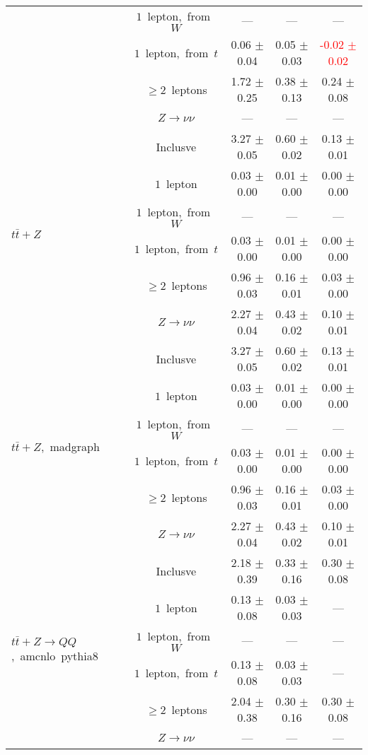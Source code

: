 \documentclass{article}
\begin{document}
\begin{longtable}{|l|c|c|c|c|}
 & $1$~lepton,~from~$W$  & ---  & ---  & --- \\* 
 & $1$~lepton,~from~$t$  & 0.06 $\pm$ 0.04  & 0.05 $\pm$ 0.03  & \textcolor{red}{ -0.02 $\pm$ 0.02 } \\* 
 & $\ge2$~leptons  & 1.72 $\pm$ 0.25  & 0.38 $\pm$ 0.13  & 0.24 $\pm$ 0.08 \\* 
 & $Z\rightarrow\nu\nu$  & ---  & ---  & --- \\* 
\hline 
\multirow{6}{*}{$t\bar{t}+Z$} & Inclusve  & 3.27 $\pm$ 0.05  & 0.60 $\pm$ 0.02  & 0.13 $\pm$ 0.01 \\* 
 & $1$~lepton  & 0.03 $\pm$ 0.00  & 0.01 $\pm$ 0.00  & 0.00 $\pm$ 0.00 \\* 
 & $1$~lepton,~from~$W$  & ---  & ---  & --- \\* 
 & $1$~lepton,~from~$t$  & 0.03 $\pm$ 0.00  & 0.01 $\pm$ 0.00  & 0.00 $\pm$ 0.00 \\* 
 & $\ge2$~leptons  & 0.96 $\pm$ 0.03  & 0.16 $\pm$ 0.01  & 0.03 $\pm$ 0.00 \\* 
 & $Z\rightarrow\nu\nu$  & 2.27 $\pm$ 0.04  & 0.43 $\pm$ 0.02  & 0.10 $\pm$ 0.01 \\* 
\hline 
\multirow{6}{*}{$t\bar{t}+Z$,~madgraph} & Inclusve  & 3.27 $\pm$ 0.05  & 0.60 $\pm$ 0.02  & 0.13 $\pm$ 0.01 \\* 
 & $1$~lepton  & 0.03 $\pm$ 0.00  & 0.01 $\pm$ 0.00  & 0.00 $\pm$ 0.00 \\* 
 & $1$~lepton,~from~$W$  & ---  & ---  & --- \\* 
 & $1$~lepton,~from~$t$  & 0.03 $\pm$ 0.00  & 0.01 $\pm$ 0.00  & 0.00 $\pm$ 0.00 \\* 
 & $\ge2$~leptons  & 0.96 $\pm$ 0.03  & 0.16 $\pm$ 0.01  & 0.03 $\pm$ 0.00 \\* 
 & $Z\rightarrow\nu\nu$  & 2.27 $\pm$ 0.04  & 0.43 $\pm$ 0.02  & 0.10 $\pm$ 0.01 \\* 
\hline 
\multirow{6}{*}{$t\bar{t}+Z{\rightarrow}QQ$,~amcnlo~pythia8} & Inclusve  & 2.18 $\pm$ 0.39  & 0.33 $\pm$ 0.16  & 0.30 $\pm$ 0.08 \\* 
 & $1$~lepton  & 0.13 $\pm$ 0.08  & 0.03 $\pm$ 0.03  & --- \\* 
 & $1$~lepton,~from~$W$  & ---  & ---  & --- \\* 
 & $1$~lepton,~from~$t$  & 0.13 $\pm$ 0.08  & 0.03 $\pm$ 0.03  & --- \\* 
 & $\ge2$~leptons  & 2.04 $\pm$ 0.38  & 0.30 $\pm$ 0.16  & 0.30 $\pm$ 0.08 \\* 
 & $Z\rightarrow\nu\nu$  & ---  & ---  & --- \\* 

\end{longtable}
\end{document}
